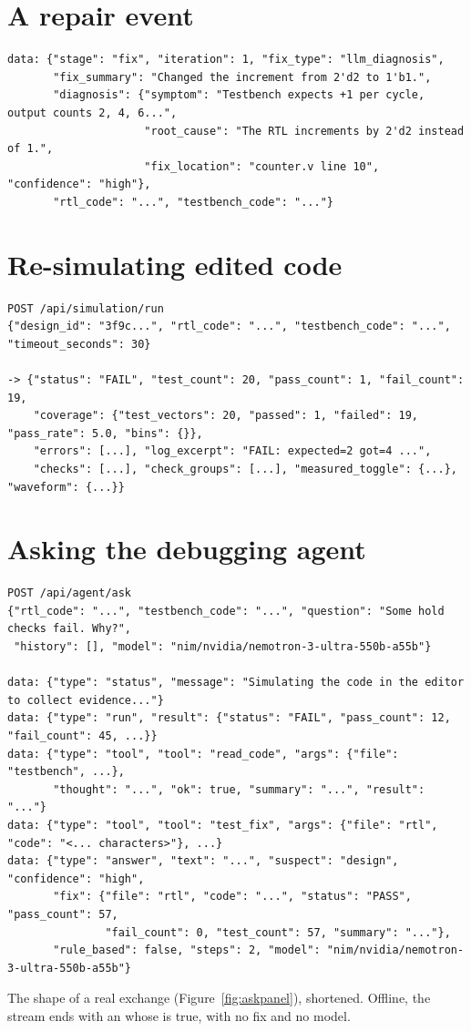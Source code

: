 \section{A repair event}

\begin{lstlisting}[style=plain]
data: {"stage": "fix", "iteration": 1, "fix_type": "llm_diagnosis",
       "fix_summary": "Changed the increment from 2'd2 to 1'b1.",
       "diagnosis": {"symptom": "Testbench expects +1 per cycle, output counts 2, 4, 6...",
                     "root_cause": "The RTL increments by 2'd2 instead of 1.",
                     "fix_location": "counter.v line 10", "confidence": "high"},
       "rtl_code": "...", "testbench_code": "..."}
\end{lstlisting}

\section{Re-simulating edited code}

\begin{lstlisting}[style=plain]
POST /api/simulation/run
{"design_id": "3f9c...", "rtl_code": "...", "testbench_code": "...", "timeout_seconds": 30}

-> {"status": "FAIL", "test_count": 20, "pass_count": 1, "fail_count": 19,
    "coverage": {"test_vectors": 20, "passed": 1, "failed": 19, "pass_rate": 5.0, "bins": {}},
    "errors": [...], "log_excerpt": "FAIL: expected=2 got=4 ...",
    "checks": [...], "check_groups": [...], "measured_toggle": {...}, "waveform": {...}}
\end{lstlisting}

\section{Asking the debugging agent}

\begin{lstlisting}[style=plain]
POST /api/agent/ask
{"rtl_code": "...", "testbench_code": "...", "question": "Some hold checks fail. Why?",
 "history": [], "model": "nim/nvidia/nemotron-3-ultra-550b-a55b"}

data: {"type": "status", "message": "Simulating the code in the editor to collect evidence..."}
data: {"type": "run", "result": {"status": "FAIL", "pass_count": 12, "fail_count": 45, ...}}
data: {"type": "tool", "tool": "read_code", "args": {"file": "testbench", ...},
       "thought": "...", "ok": true, "summary": "...", "result": "..."}
data: {"type": "tool", "tool": "test_fix", "args": {"file": "rtl", "code": "<... characters>"}, ...}
data: {"type": "answer", "text": "...", "suspect": "design", "confidence": "high",
       "fix": {"file": "rtl", "code": "...", "status": "PASS", "pass_count": 57,
               "fail_count": 0, "test_count": 57, "summary": "..."},
       "rule_based": false, "steps": 2, "model": "nim/nvidia/nemotron-3-ultra-550b-a55b"}
\end{lstlisting}
The shape of a real exchange (Figure~\ref{fig:askpanel}), shortened. Offline, the stream ends with an  whose  is true, with no fix and no model.

